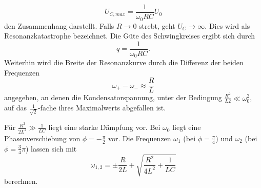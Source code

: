 \begin{equation}
    U_{C,max} = \frac{1}{\omega_0 RC} U_0 
\end{equation}
\noindent
den Zusammenhang darstellt. Falls $R \rightarrow 0$ strebt, geht $U_C \rightarrow \infty$. Dies 
wird als Resonanzkatastrophe bezeichnet. Die Güte des Schwingkreises ergibt sich durch
\begin{equation}
    q = \frac{1}{\omega_0 RC}.
\end{equation}
\noindent
Weiterhin wird die Breite der Resonanzkurve durch die Differenz der beiden Frequenzen 
\begin{equation}
    \omega_+ - \omega_- \approx \frac{R}{L}
\end{equation}
angegeben, an denen die Kondensatorspannung, unter der Bedingung 
$\frac{R^{2}}{L{2}} \ll \omega_0^{2}$, auf das $\frac{1}{\sqrt{2}}$-fache
ihres Maximalwerts abgefallen ist.  

Für $\frac{R^{2}}{2L^{2}} \gg \frac{1}{LC}$ liegt eine starke Dämpfung vor. Bei $\omega_0$ liegt
eine Phasenverschiebung von $\phi = -\frac{\pi}{2}$ vor. Die Frequenzen $\omega_1$ (bei $\phi = \frac{\pi}{4}$) und
$\omega_2$ (bei $\phi = \frac{3}{4}\pi$) lassen sich mit 
\begin{equation}
    \omega_{1,2} = \pm \frac{R}{2L} + \sqrt{\frac{R^{2}}{4L^{2}}+\frac{1}{LC}}
\end{equation}
\noindent berechnen.

